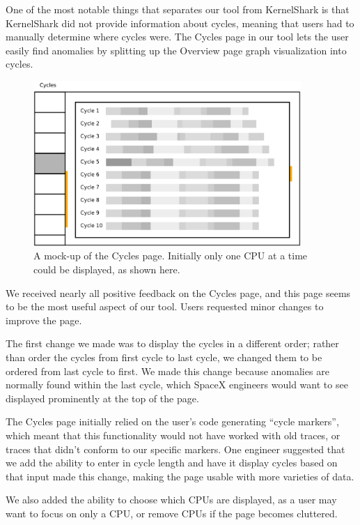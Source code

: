 \documentclass{hmcclinic}
\begin{document}
One of the most notable things that separates our tool from KernelShark is that
KernelShark did not provide information about cycles, meaning that users had to
manually determine where cycles were.
The Cycles page in our tool lets the user easily find anomalies by splitting up
the Overview page graph visualization into cycles.

\begin{figure}[H]
\begin{center}
\includegraphics[width=4in]{oldcycles.png}
\caption{A mock-up of the Cycles page. Initially only one CPU at a time could be
displayed, as shown here.}
\end{center}
\end{figure}

We received nearly all positive feedback on the Cycles page, and this page seems to
be the most useful aspect of our tool. Users requested minor changes to improve
the page.

The first change we made was to display the cycles in a different order; rather than order the cycles from
first cycle to last cycle, we changed them to be ordered from last cycle to first.
We made this change because anomalies are normally found within the last cycle,
which SpaceX engineers would want to see displayed prominently at the top of the
page.

The Cycles page initially relied on the user's code generating ``cycle
markers'', which meant that this functionality would not have worked with old
traces, or traces that didn't conform to our specific markers. One engineer
suggested that we add the ability to enter in cycle length and have it display
cycles based on that input made this change, making the page usable with more
varieties of data.

We also added the ability to choose which CPUs are displayed, as a user may
want to focus on only a CPU, or remove CPUs if the page becomes cluttered.
\end{document}
